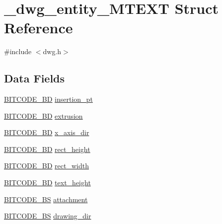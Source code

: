 \hypertarget{struct__dwg__entity__MTEXT}{\section{\-\_\-dwg\-\_\-entity\-\_\-\-M\-T\-E\-X\-T \-Struct \-Reference}
\label{struct__dwg__entity__MTEXT}
}


{\ttfamily \#include $<$dwg.\-h$>$}

\subsection*{\-Data \-Fields}
\begin{DoxyCompactItemize}
\item 
\hyperlink{dwg_8h_a00698ef1bb072aa0a9360c6fc1c57587}{\-B\-I\-T\-C\-O\-D\-E\-\_\-B\-D} \hyperlink{struct__dwg__entity__MTEXT_a55988aca6025c457a975b8ad53031411}{insertion\-\_\-pt}
\item 
\hyperlink{dwg_8h_a00698ef1bb072aa0a9360c6fc1c57587}{\-B\-I\-T\-C\-O\-D\-E\-\_\-B\-D} \hyperlink{struct__dwg__entity__MTEXT_a5199a619345b49b9f0ef59d7638e1174}{extrusion}
\item 
\hyperlink{dwg_8h_a00698ef1bb072aa0a9360c6fc1c57587}{\-B\-I\-T\-C\-O\-D\-E\-\_\-B\-D} \hyperlink{struct__dwg__entity__MTEXT_a35eef2291311a04b7639702895e2576b}{x\-\_\-axis\-\_\-dir}
\item 
\hyperlink{dwg_8h_a3c1e6781466b74ba07785d57da70ed97}{\-B\-I\-T\-C\-O\-D\-E\-\_\-\-B\-D} \hyperlink{struct__dwg__entity__MTEXT_ae0233c44d7feda836aa73a5c18e95c34}{rect\-\_\-height}
\item 
\hyperlink{dwg_8h_a3c1e6781466b74ba07785d57da70ed97}{\-B\-I\-T\-C\-O\-D\-E\-\_\-\-B\-D} \hyperlink{struct__dwg__entity__MTEXT_a61fdea55f2ec420b98431963e78c6dd5}{rect\-\_\-width}
\item 
\hyperlink{dwg_8h_a3c1e6781466b74ba07785d57da70ed97}{\-B\-I\-T\-C\-O\-D\-E\-\_\-\-B\-D} \hyperlink{struct__dwg__entity__MTEXT_aca7ba772e12eb297cc2655360861df27}{text\-\_\-height}
\item 
\hyperlink{dwg_8h_a94297606fbd4a4ff97e8add284af0809}{\-B\-I\-T\-C\-O\-D\-E\-\_\-\-B\-S} \hyperlink{struct__dwg__entity__MTEXT_a23431207f4e3e8e2e40bac6b35b58e48}{attachment}
\item 
\hyperlink{dwg_8h_a94297606fbd4a4ff97e8add284af0809}{\-B\-I\-T\-C\-O\-D\-E\-\_\-\-B\-S} \hyperlink{struct__dwg__entity__MTEXT_acd7d3f6a5bf7c0bb5aaba7f0276a2e31}{drawing\-\_\-dir}
\item 

\end{DoxyCompactItemize}
